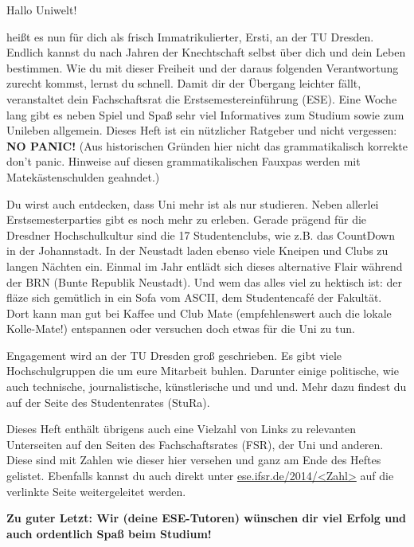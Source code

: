 
Hallo Uniwelt!

heißt es nun für dich als frisch Immatrikulierter, Ersti, an der TU Dresden. 
Endlich kannst du nach Jahren der Knechtschaft selbst über dich und dein Leben bestimmen. 
Wie du mit dieser Freiheit und der daraus folgenden Verantwortung zurecht kommst, lernst du schnell. 
Damit dir der Übergang leichter fällt, veranstaltet dein Fachschaftsrat die Erstsemestereinführung (ESE). 
Eine Woche lang gibt es neben Spiel und Spaß sehr viel Informatives zum Studium sowie zum Unileben allgemein. 
Dieses Heft ist ein nützlicher Ratgeber und nicht vergessen: 
\textbf{NO PANIC!} (Aus historischen Gründen hier nicht das grammatikalisch korrekte \glqq don't panic\grqq. Hinweise auf diesen grammatikalischen Fauxpas werden mit Matekästenschulden geahndet.)

Du wirst auch entdecken, dass Uni mehr ist als nur studieren. 
Neben allerlei Erstsemesterparties gibt es noch mehr zu erleben. 
Gerade prägend für die Dresdner Hochschulkultur sind die 17 Studentenclubs, wie z.B. das CountDown in der Johannstadt. 
In der Neustadt laden ebenso viele Kneipen und Clubs zu langen Nächten ein. 
Einmal im Jahr entlädt sich dieses alternative Flair während der BRN (Bunte Republik Neustadt). 
Und wem das alles viel zu hektisch ist: der fläze sich gemütlich in ein Sofa vom ASCII, dem Studentencafé der Fakultät. 
Dort kann man gut bei Kaffee und Club Mate (empfehlenswert auch die lokale Kolle-Mate!) entspannen oder versuchen doch etwas für die Uni zu tun.

Engagement wird an der TU Dresden groß geschrieben. 
Es gibt viele Hochschulgruppen die um eure Mitarbeit buhlen. 
Darunter einige politische, wie auch technische, journalistische, künstlerische und und und. Mehr dazu findest du auf der Seite des Studentenrates (StuRa).

Dieses Heft enthält übrigens auch eine Vielzahl von Links zu relevanten Unterseiten auf den Seiten des Fachschaftsrates (FSR), der Uni und anderen. 
Diese sind mit Zahlen wie dieser hier  versehen und ganz am Ende des Heftes gelistet. Ebenfalls kannst du auch direkt unter \url{ese.ifsr.de/2014/<Zahl>} auf die verlinkte Seite weitergeleitet werden.

\textbf{Zu guter Letzt: Wir (deine ESE-Tutoren) wünschen dir viel Erfolg und auch ordentlich Spaß beim Studium!}
